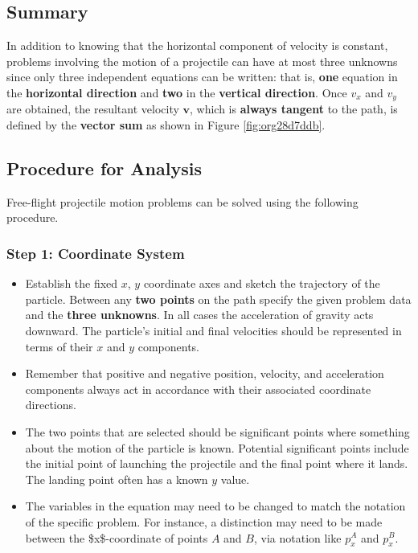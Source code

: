 \documentclass[11pt]{article}
\begin{document}
\subsection{Summary}
\label{sec:org7b93a7e}

In addition to knowing that the horizontal component of velocity is
constant, problems involving the motion of a projectile can have at
most three unknowns since only three independent equations can be
written: that is, \textbf{one} equation in the \textbf{horizontal direction} and
\textbf{two} in the \textbf{vertical direction}.  Once \(v_x\) and \(v_y\) are obtained,
the resultant velocity \(\mathbf{v}\), which is \textbf{always tangent} to the
path, is defined by the \textbf{vector sum} as shown in Figure \ref{fig:org28d7ddb}.

\subsection{Procedure for Analysis}
\label{sec:orgcd65349}

Free-flight projectile motion problems can be solved using the
following procedure.

\subsubsection{Step 1: Coordinate System}
\label{sec:org98dcf1d}

\begin{itemize}
\item Establish the fixed \(x\), \(y\) coordinate axes and sketch the
trajectory of the particle.  Between any \textbf{two points} on the path
specify the given problem data and the \textbf{three unknowns}.  In all
cases the acceleration of gravity acts downward.  The particle's
initial and final velocities should be represented in terms of their
\(x\) and \(y\) components.

\item Remember that positive and negative position, velocity, and
acceleration components always act in accordance with their
associated coordinate directions.

\item The two points that are selected should be significant points where
something about the motion of the particle is known.  Potential
significant points include the initial point of launching the
projectile and the final point where it lands. The landing point
often has a known \(y\) value.

\item The variables in the equation may need to be changed to match the
notation of the specific problem.  For instance, a distinction may
need to be made between the \$x\$-coordinate of points \(A\) and \(B\),
via notation like \(p_x^A\) and \(p_x^B\).
\end{itemize}
\end{document}
